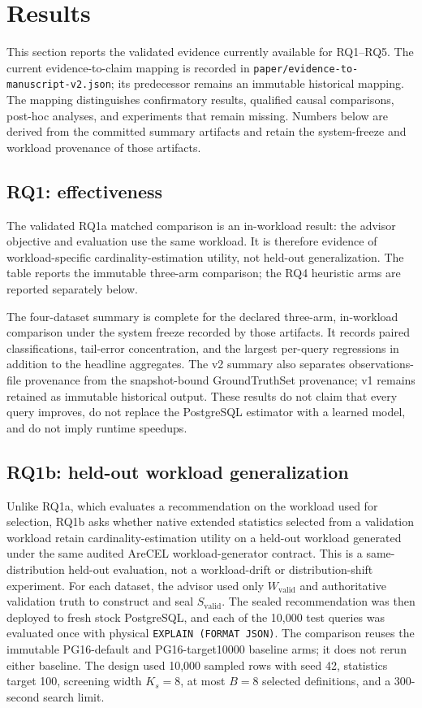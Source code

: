\section{Results}

This section reports the validated evidence currently available for RQ1--RQ5.
The current evidence-to-claim mapping is recorded in
\texttt{paper/evidence-to-manuscript-v2.json}; its predecessor remains an
immutable historical mapping. The mapping distinguishes confirmatory results,
qualified causal comparisons, post-hoc analyses, and experiments that remain
missing.
Numbers below are derived from the committed summary artifacts and retain the
system-freeze and workload provenance of those artifacts.

\subsection{RQ1: effectiveness}
The validated RQ1a matched comparison is an in-workload result: the advisor
objective and evaluation use the same workload. It is therefore evidence of
workload-specific cardinality-estimation utility, not held-out generalization.
The table reports the immutable three-arm comparison; the RQ4 heuristic arms
are reported separately below.



The four-dataset summary is complete for the declared three-arm, in-workload
comparison under the system freeze recorded by those artifacts. It records
paired classifications, tail-error concentration, and the largest per-query
regressions in addition to the headline aggregates.
The v2 summary also separates observations-file provenance from the
snapshot-bound GroundTruthSet provenance; v1 remains retained as immutable
historical output.
These results do not claim that every query improves, do not replace the
PostgreSQL estimator with a learned model, and do not imply runtime speedups.

\subsection{RQ1b: held-out workload generalization}
Unlike RQ1a, which evaluates a recommendation on the workload used for
selection, RQ1b asks whether native extended statistics selected from a validation
workload retain cardinality-estimation utility on a held-out workload
generated under the same audited AreCEL workload-generator contract. This is a
same-distribution held-out evaluation, not a workload-drift or
distribution-shift experiment. For each dataset, the advisor used only
$W_{\mathrm{valid}}$ and authoritative validation truth to construct and seal
$S_{\mathrm{valid}}$. The sealed recommendation was then deployed to fresh
stock PostgreSQL, and each of the 10,000 test queries was evaluated once with
physical \texttt{EXPLAIN (FORMAT JSON)}. The comparison reuses the immutable
PG16-default and PG16-target10000 baseline arms; it does not rerun either
baseline. The design used 10,000 sampled rows with seed 42, statistics target
100, screening width $K_s=8$, at most $B=8$ selected definitions, and a
300-second search limit.

